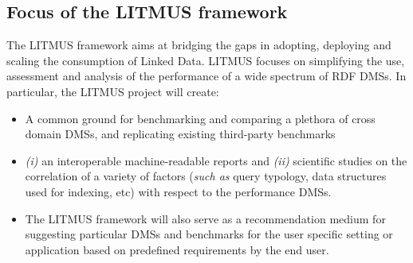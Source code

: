 \documentclass{llncs}
\begin{document}
    \subsection{Focus of the LITMUS framework}
        The LITMUS framework aims at bridging the gaps in adopting, deploying and scaling the consumption of Linked Data. LITMUS focuses on simplifying the use, assessment and analysis of the performance of a wide spectrum of RDF DMSs. In particular, the LITMUS project will create: 
        \begin{itemize}[nosep]
            \item {} A common ground for benchmarking and comparing a plethora of cross domain DMSs, and replicating existing third-party benchmarks 
            \item {} \textit{(i)} an interoperable machine-readable reports and \textit{(ii)} scientific studies on the correlation of a variety of factors (\textit{such as} query typology, data structures used for indexing, etc) with respect to the performance DMSs. 
            \item {} The LITMUS framework will also serve as a recommendation medium for suggesting particular DMSs and benchmarks for the user specific setting or application based on predefined requirements by the end user.  
        \end{itemize}
            
        
\end{document}
